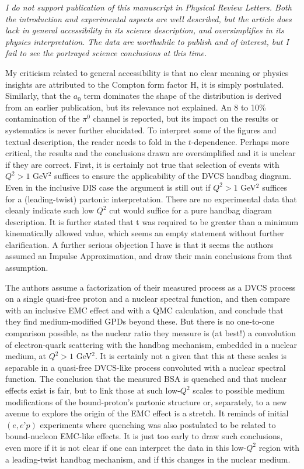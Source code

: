 \documentclass{article}
\begin{document}
{\em I do not support publication of this manuscript in Physical Review Letters. Both the introduction and experimental aspects are well described, but the article does lack in general accessibility in its science description, and oversimplifies in its physics interpretation. The data are worthwhile to publish and of interest, but I fail to see the portrayed science conclusions at this time.

My criticism related to general accessibility is that no clear meaning or physics insights are attributed to the Compton form factor H, it is simply postulated. Similarly, that the $a_0$ term dominates the shape of the distribution is derived from an earlier publication, but its relevance not explained. An 8 to 10\% contamination of the $\pi^0$ channel is reported, but its impact on the results or systematics is never further elucidated. To interpret some of the figures and textual description, the reader needs to fold in the $t$-dependence. Perhaps more critical, the results and the conclusions drawn are oversimplified and it is unclear if they are correct. First, it is certainly not true that selection of events with $Q^2>1$  GeV$^2$ suffices to ensure the applicability of the DVCS handbag diagram. Even in the inclusive DIS case the argument is still out if $Q^2>1$ GeV$^2$ suffices for a (leading-twist) partonic interpretation. There are no experimental data that cleanly indicate such low $Q^2$ cut would suffice for a pure handbag diagram description. It is further stated that t was required to be greater than a minimum kinematically allowed value, which seems an empty statement without further clarification.  A further serious objection I have is that it seems the authors assumed an Impulse Approximation, and draw their main conclusions from that assumption.

The authors assume a factorization of their measured process as a DVCS process on a single quasi-free proton and a nuclear spectral function, and then compare with an inclusive EMC effect and with a QMC calculation, and conclude that they find medium-modified GPDs beyond these. But there is no one-to-one comparison possible, as the nuclear ratio they measure is (at best!) a convolution of electron-quark scattering with the handbag mechanism, embedded in a nuclear medium, at $Q^2 > 1 $ GeV$^2$. It is certainly not a given that this at these scales is separable in a quasi-free DVCS-like process convoluted with a nuclear spectral function. The conclusion that the measured BSA is quenched and that nuclear effects exist is fair, but to link those at such low-$Q^2$ scales to possible medium modifications of the bound-proton’s partonic structure or, separately, to a new avenue to explore the origin of the EMC effect is a stretch. It reminds of initial $(e,e’p)$ experiments where quenching was also postulated to be related to bound-nucleon EMC-like effects. It is just too early to draw such conclusions, even more if it is not clear if one can interpret the data in this low-$Q^2$ region with a leading-twist handbag mechanism, and if this changes in the nuclear medium.}
\end{document}
